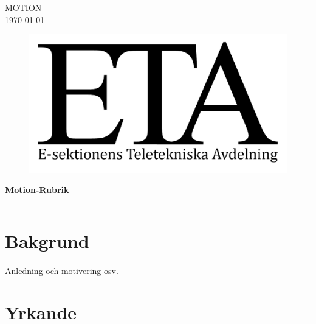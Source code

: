 \documentclass[a4paper, 12pt]{article}
\begin{document}
\titlespacing{\subsection}{0pt}{\parskip}{-\parskip}
\titlespacing{\subsubsection}{0pt}{\parskip}{-\parskip}

\flushright
MOTION\\
\today

\flushleft

\begin{figure}[h]
    \includegraphics[scale = 2.4]{ETA-logga.png}
\end{figure}
{\LARGE \textbf{Motion-Rubrik}}         %
\newline
\noindent\rule{\textwidth}{1pt}

\section*{Bakgrund}                     %
\paragraph{}
Anledning och motivering osv.


\section*{Yrkande}
\end{document}
